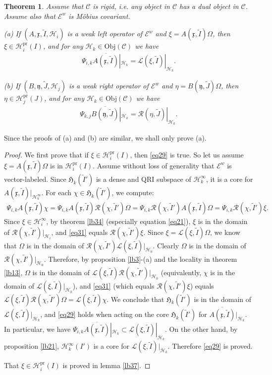 \documentclass[11pt,b5paper,notitlepage]{article}
\theoremstyle{definition}
\theoremstyle{plain}
\newtheorem{thm}[df]{Theorem}
\newcommand{\fk}{\mathfrak}
\newcommand{\mc}{\mathcal}
\newcommand{\wtd}{\widetilde}
\newcommand{\ovl}{\overline}
\newcommand{\scr}{\mathscr}
\newcommand{\Obj}{\mathrm{Obj}}
\newcommand{\pr}{\mathrm{pr}}
\numberwithin{equation}{subsection}
\begin{document}
\begin{thm}\label{lb36}
Assume that $\scr C$ is rigid, i.e. any object in $\scr C$ has a dual object in $\scr C$. Assume also that $\scr E^w$ is M\"obius covariant. 

(a) If $(A,\fk x,\wtd I,\mc H_i)$ is a weak left operator of $\scr E^w$ and $\xi=A(\fk x,\wtd I)\Omega$, then $\xi\in\mc H_i^\pr(I)$, and for any $\mc H_k\in\Obj(\scr C)$ we have
\begin{align}
\Psi_{i,k}\ovl{A(\fk x,\wtd I)}|_{\mc H_k}=\scr L(\xi,\wtd I)|_{\mc H_k}.\label{eq29}
\end{align}

(b) If $(B,\fk y,\wtd J,\mc H_j)$ is a weak right operator of $\scr E^w$ and $\eta=B(\fk y,\wtd J)\Omega$, then $\eta\in\mc H_j^\pr(J)$, and for any $\mc H_k\in\Obj(\scr C)$ we have
\begin{align}
\Psi_{k,j}\ovl{B(\fk y,\wtd J)}|_{\mc H_k}=\scr R(\eta,\wtd J)|_{\mc H_k}.\label{eq30}
\end{align}
\end{thm}
Since the proofs of (a) and (b) are similar, we shall only prove (a).
\begin{proof}
We first prove that if $\xi\in\mc H_i^\pr(I)$, then \eqref{eq29} is true. So let us assume $\xi=A(\fk x,\wtd I)\Omega$ is in $\mc H_i^\pr(I)$. Assume without loss of generality that $\scr E^w$ is vector-labeled. Since $\fk H_k(\wtd I')$ is a dense and QRI subspace of  $\mc H_k^\infty$, it is a core for $A(\fk x,\wtd I)|_{\mc H_k^\infty}$. For each $\chi\in\fk H_k(\wtd I')$, we compute:
\begin{align}
\Psi_{i,k} A(\fk x,\wtd I)\chi=\Psi_{i,k} A(\fk x,\wtd I)\mc R(\chi,\wtd I')\Omega=\Psi_{i,k} \mc R(\chi,\wtd I')A(\fk x,\wtd I)\Omega=\Psi_{i,k} \mc R(\chi,\wtd I')\xi.\label{eq31}
\end{align}
Since $\xi\in\mc H_i^\infty$, by theorem \ref{lb34} (especially equation \eqref{eq21}), $\xi$ is in the domain of $\scr R(\chi,\wtd I')|_{\mc H_i}$, and \eqref{eq31} equals $\scr R(\chi,\wtd I')\xi$. Since $\xi=\scr L(\xi,\wtd I)\Omega$, we know that $\Omega$ is in the domain of $\scr R(\chi,\wtd I')\scr L(\xi,\wtd I)|_{\mc H_0}$. Clearly $\Omega$ is in the domain of $\scr R(\chi,\wtd I')|_{\mc H_0}$. Therefore, by proposition \ref{lb3}-(a) and the locality in theorem \ref{lb13}, $\Omega$ is in the domain of $\scr L(\xi,\wtd I)\scr R(\chi,\wtd I')|_{\mc H_0}$ (equivalently, $\chi$ is in the domain of $\scr L(\xi,\wtd I)|_{\mc H_k}$), and \eqref{eq31} (which equals $\scr R(\chi,\wtd I')\xi$) equals $\scr L(\xi,\wtd I)\scr R(\chi,\wtd I')\Omega=\scr L(\xi,\wtd I)\chi$. We conclude that $\fk H_k(\wtd I')$ is in the domain of $\scr L(\xi,\wtd I)|_{\mc H_k}$, and \eqref{eq29} holds when acting on the core $\fk H_k(\wtd I')$ for $\ovl{A(\fk x,\wtd I)}|_{\mc H_k}$. In particular, we have $\Psi_{i,k}\ovl{A(\fk x,\wtd I)}|_{\mc H_k}\subset\scr L(\xi,\wtd I)|_{\mc H_k}$. On the other hand, by proposition \ref{lb21}, $\mc H_k^\infty(I')$ is a core for $\scr L(\xi,\wtd I)|_{\mc H_k}$. Therefore \eqref{eq29} is proved.

That $\xi\in\mc H_i^\pr(I)$ is proved in lemma \ref{lb37}.
\end{proof}
\end{document}
